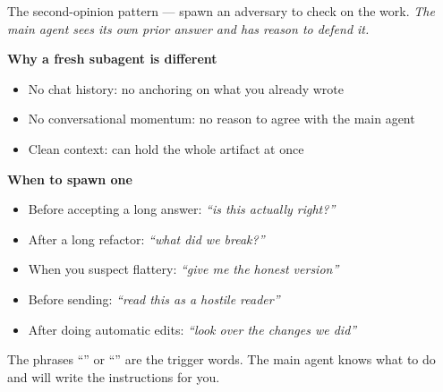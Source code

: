 \documentclass[aspectratio=169, 10pt]{beamer}
\begin{document}
\begin{frame}{The second-opinion pattern --- spawn an adversary to check on the work. }
\textit{The main agent sees its own prior answer and has reason to defend it.}

\vskip0.2cm
\textbf{Why a fresh subagent is different}
\begin{itemize}\footnotesize
  \item No chat history: no anchoring on what you already wrote
  \item No conversational momentum: no reason to agree with the main agent
  \item Clean context: can hold the whole artifact at once
\end{itemize}

\vskip0.2cm
\textbf{When to spawn one}
\begin{itemize}\footnotesize
  \item Before accepting a long answer: \textit{``is this actually right?''}
  \item After a long refactor: \textit{``what did we break?''}
  \item When you suspect flattery: \textit{``give me the honest version''}
  \item Before sending: \textit{``read this as a hostile reader''}
  \item After doing automatic edits: \textit{``look over the changes we did''}
\end{itemize}

\vskip0.1cm
\begin{sowhat}
The phrases ``'' or ``'' are the trigger words. The main agent knows what to do and will write the instructions for you.
\end{sowhat}
\end{frame}


\end{document}
